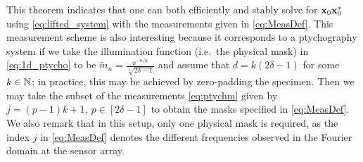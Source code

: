 This theorem indicates that one can both efficiently and stably solve for $\mathbf x_0 \mathbf x_0^*$ using \eqref{eq:lifted_system} with the measurements given in \eqref{eq:MeasDef}.   This measurement scheme is also interesting because it corresponds to a ptychography system if we take the illumination function (i.e.~the physical mask) in \eqref{eq:1d_ptycho} to be $\widetilde{m}_n = \frac{\ee^{- n / a}}{\sqrt[4]{2 \delta - 1}}$ and assume that $d = k(2 \delta - 1)$ for some $k \in \mathbb{N}$; in practice, this may be achieved by zero-padding the specimen.  Then we may take the subset of the measurements \eqref{eq:ptychm} given by $j = (p -1)k + 1, \ p \in [2 \delta - 1]$ to obtain the masks specified in \eqref{eq:MeasDef}.  We also remark that in this setup, only one physical mask is required, as the index $j$ in \eqref{eq:MeasDef} denotes the different frequencies observed in the Fourier domain at the sensor array.


